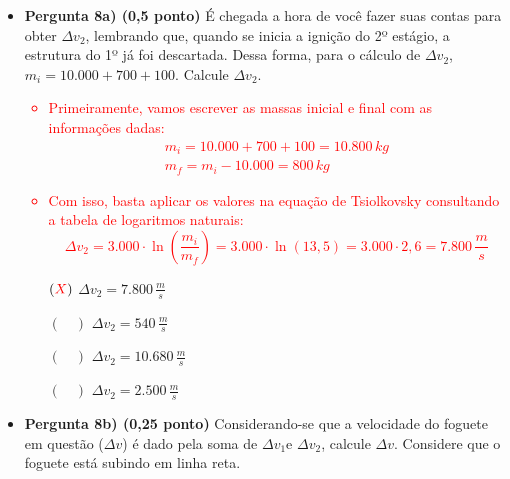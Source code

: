 \documentclass[a4paper, 12pt]{article}
\newcommand{\red}[1]{\textcolor{red}{#1}}
\begin{document}
\begin{flushleft}
\begin{itemize}
\begin{itemize}
                    \item \textbf{Pergunta 8a) (0,5 ponto)} É chegada a hora de você fazer suas contas para obter $\Delta v_2$, lembrando que, quando se inicia a ignição do 2º estágio, a estrutura do 1º já foi descartada. Dessa forma, para o cálculo de $\Delta v_2$, $m_i = 10.000 + 700 + 100$. Calcule $\Delta v_2$.
                        \red{\begin{itemize}
                            \item Primeiramente, vamos escrever as massas inicial e final com as informações dadas:
                                \begin{equation*} \begin{gathered}
                                    m_i=10.000 + 700 + 100=10.800 \, kg \\
                                    m_f=m_i-10.000=800 \, kg
                                \end{gathered} \end{equation*}
                            \item Com isso, basta aplicar os valores na equação de Tsiolkovsky consultando a tabela de logaritmos naturais:
                                \begin{equation*}
                                    \Delta v_2 = 3.000 \cdot \ln \left(\frac{m_i}{m_f}\right) = 3.000 \cdot \ln (13,5) = 3.000 \cdot 2,6 =7.800 \, \frac{m}{s}
                                \end{equation*}
                        \end{itemize}}
                        \begin{itemize}
                            \item[$(\red{X})$] $\Delta v_2 = 7.800 \, \frac{m}{s}$
                            \item[$(\quad)$] $\Delta v_2 = 540 \, \frac{m}{s}$
                            \item[$(\quad)$] $\Delta v_2 = 10.680 \, \frac{m}{s}$
                            \item[$(\quad)$] $\Delta v_2 = 2.500 \, \frac{m}{s}$
                        \end{itemize}
                    \item \textbf{Pergunta 8b) (0,25 ponto)} Considerando-se que a velocidade do foguete em questão ($\Delta v$) é dado pela soma de $\Delta v_1$e $\Delta v_2$, calcule $\Delta v$. Considere que o foguete está subindo em linha reta.
                        \red{\begin{itemize}

\end{itemize}}
\end{itemize}
\end{itemize}
\end{flushleft}
\end{document}
